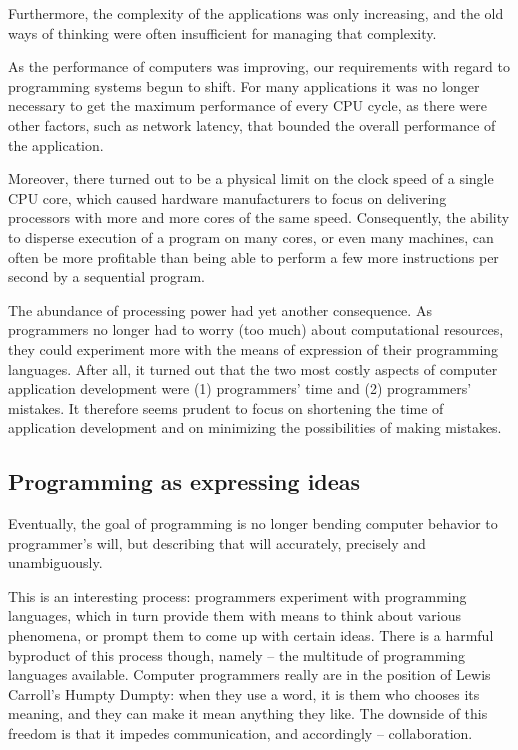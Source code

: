 Furthermore, the complexity of the applications was only increasing,
and the old ways of thinking were often insufficient for managing that
complexity.

As the performance of computers was improving, our requirements
with regard to programming systems begun to shift. For many applications
it was no longer necessary to get the maximum performance of every
CPU cycle, as there were other factors, such as network latency, that
bounded the overall performance of the application.

Moreover, there turned out to be a physical limit on the clock speed
of a single CPU core, which caused hardware manufacturers to focus
on delivering processors with more and more cores of the same speed.
Consequently, the ability to disperse execution of a program on many
cores, or even many machines, can often be more profitable than being
able to perform a few more instructions per second by a sequential
program.

The abundance of processing power had yet another consequence.
As programmers no longer had to worry (too much) about computational
resources, they could experiment more with the means of expression
of their programming languages. After all, it turned out that the two
most costly aspects of computer application development were
(1) programmers' time and (2) programmers' mistakes. It therefore
seems prudent to focus on shortening the time of application development
and on minimizing the possibilities of making mistakes.

\subsection{Programming as expressing ideas}

Eventually, the goal of programming is no longer bending computer
behavior to programmer's will, but describing that will accurately,
precisely and unambiguously. 

This is an interesting process: programmers experiment with programming
languages, which in turn provide them with means to think about various
phenomena, or prompt them to come up with certain ideas. There is
a harmful byproduct of this process though, namely -- the multitude
of programming languages available. Computer programmers really are
in the position of Lewis Carroll's Humpty Dumpty: when they use
a word, it is them who chooses its meaning, and they can make it
mean anything they like. The downside of this freedom is that it
impedes communication, and accordingly -- collaboration.

